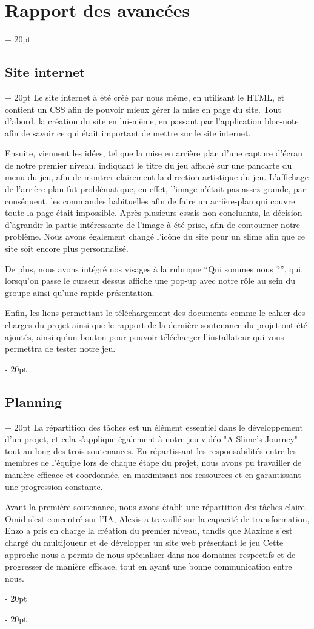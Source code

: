 \documentclass[a4paper, 12pt, twoside]{article}
\newcommand{\ind}[1][20pt]{\advance\leftskip + #1}
\newcommand{\deind}[1][20pt]{\advance\leftskip - #1}
\newenvironment{indt}[2][20pt]{#2 \par \ind[#1]}{\par \deind} %
\begin{document}
\begin{indt}{\section{Rapport des avancées}}
\begin{indt}{\subsection{Site internet}}
            Le site internet à été créé par nous même, en utilisant le HTML, et contient un CSS afin de pouvoir mieux gérer la mise en page du site. Tout d’abord, la création du site en lui-même, en passant par l’application bloc-note afin de savoir ce qui était important de mettre sur le site internet.

            Ensuite, viennent les idées, tel que la mise en arrière plan d’une capture d’écran de notre premier niveau, indiquant le titre du jeu affiché sur une pancarte du menu du jeu, afin de montrer clairement la direction artistique du jeu. L’affichage de l’arrière-plan fut problématique, en effet, l’image n'était pas assez grande, par conséquent, les commandes habituelles afin de faire un arrière-plan qui couvre toute la page était impossible. Après plusieurs essais non concluants, la décision d'agrandir la partie intéressante de l’image à été prise, afin de contourner notre problème. Nous avons également changé l'icône du site pour un slime afin que ce site soit encore plus personnalisé.

            De plus, nous avons intégré nos visages à la rubrique “Qui sommes nous ?”, qui, lorsqu’on passe le curseur dessus affiche une pop-up avec notre rôle au sein du groupe ainsi qu’une rapide présentation.

            Enfin, les liens permettant le téléchargement des documents comme le cahier des charges du projet ainsi que le rapport de la dernière soutenance du projet ont été ajoutés, ainsi qu’un bouton pour pouvoir télécharger l’installateur qui vous permettra de tester notre jeu.
        \end{indt}

        \newpage

        \begin{indt}{\subsection{Planning}}
            La répartition des tâches est un élément essentiel dans le développement d'un projet, et cela s'applique également à notre jeu vidéo "A Slime's Journey" tout au long des trois soutenances. En répartissant les responsabilités entre les membres de l'équipe lors de chaque étape du projet, nous avons pu travailler de manière efficace et coordonnée, en maximisant nos ressources et en garantissant une progression constante.

            Avant la première soutenance, nous avons établi une répartition des tâches claire. Omid s'est concentré sur l'IA, Alexis a travaillé sur la capacité de transformation, Enzo a pris en charge la création du premier niveau, tandis que Maxime s'est chargé du multijoueur et de développer un site web présentant le jeu Cette approche nous a permis de nous spécialiser dans nos domaines respectifs et de progresser de manière efficace, tout en ayant une bonne communication entre nous.


\end{indt}
\end{indt}
\end{document}
